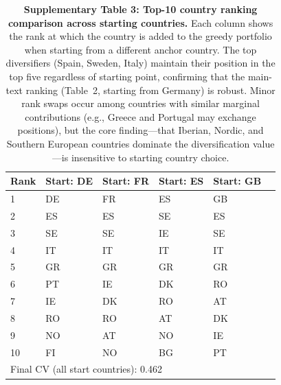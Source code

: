 \documentclass[11pt]{article}
\begin{document}
\begin{table}[H]
\centering
\caption{\textbf{Supplementary Table 3: Top-10 country ranking comparison across starting countries.} Each column shows the rank at which the country is added to the greedy portfolio when starting from a different anchor country. The top diversifiers (Spain, Sweden, Italy) maintain their position in the top five regardless of starting point, confirming that the main-text ranking (Table~2, starting from Germany) is robust. Minor rank swaps occur among countries with similar marginal contributions (e.g., Greece and Portugal may exchange positions), but the core finding---that Iberian, Nordic, and Southern European countries dominate the diversification value---is insensitive to starting country choice.}
\label{tab:sensitivity}
\begin{tabular}{llllll}
\toprule
Rank & Start: DE & Start: FR & Start: ES & Start: GB \\
\midrule
1 & DE & FR & ES & GB \\
2 & ES & ES & SE & ES \\
3 & SE & SE & IE & SE \\
4 & IT & IT & IT & IT \\
5 & GR & GR & GR & GR \\
6 & PT & IE & DK & RO \\
7 & IE & DK & RO & AT \\
8 & RO & RO & AT & DK \\
9 & NO & AT & NO & IE \\
10 & FI & NO & BG & PT \\
\midrule
\multicolumn{5}{l}{Final CV (all start countries): 0.462} \\
\bottomrule
\end{tabular}
\end{table}
\end{document}
